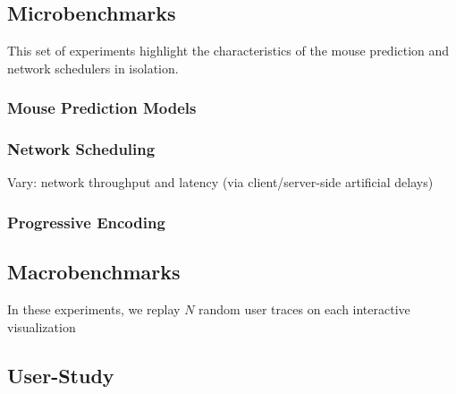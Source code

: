 \subsection{Microbenchmarks}

This set of experiments highlight the characteristics of the mouse prediction and network schedulers in isolation.

\subsubsection{Mouse Prediction Models}

\subsubsection{Network Scheduling}

Vary: network throughput and latency (via client/server-side artificial delays)

\subsubsection{Progressive Encoding}

\subsection{Macrobenchmarks}
In these experiments, we replay $N$ random user traces on each interactive visualization 

\subsection{User-Study}



